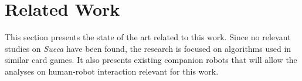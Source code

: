 \section{Related Work} \label{sec:related-work}

This section presents the state of the art related to this work.
Since no relevant studies on \emph{Sueca} have been found, the research is focused on algorithms used in similar card games.
It also presents existing companion robots that will allow the analyses on human-robot interaction relevant for this work.



